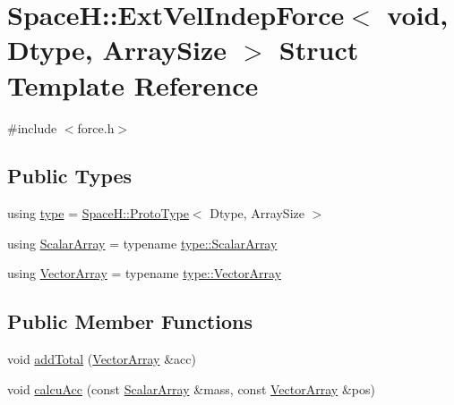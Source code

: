 \hypertarget{struct_space_h_1_1_ext_vel_indep_force_3_01void_00_01_dtype_00_01_array_size_01_4}{}\section{SpaceH\+:\+:Ext\+Vel\+Indep\+Force$<$ void, Dtype, Array\+Size $>$ Struct Template Reference}
\label{struct_space_h_1_1_ext_vel_indep_force_3_01void_00_01_dtype_00_01_array_size_01_4}


{\ttfamily \#include $<$force.\+h$>$}

\subsection*{Public Types}
\begin{DoxyCompactItemize}
\item 
using \mbox{\hyperlink{struct_space_h_1_1_ext_vel_indep_force_3_01void_00_01_dtype_00_01_array_size_01_4_a1d5ec14368fdd57d1cea251229ba72f7}{type}} = \mbox{\hyperlink{struct_space_h_1_1_proto_type}{Space\+H\+::\+Proto\+Type}}$<$ Dtype, Array\+Size $>$
\item 
using \mbox{\hyperlink{struct_space_h_1_1_ext_vel_indep_force_3_01void_00_01_dtype_00_01_array_size_01_4_ab186d960b853d69afb7cdbb19af71639}{Scalar\+Array}} = typename \mbox{\hyperlink{struct_space_h_1_1_proto_type_a09ef91dc8a37a044c403f5a833044725}{type\+::\+Scalar\+Array}}
\item 
using \mbox{\hyperlink{struct_space_h_1_1_ext_vel_indep_force_3_01void_00_01_dtype_00_01_array_size_01_4_a2f23924c3395826cf1701b5b0c74be50}{Vector\+Array}} = typename \mbox{\hyperlink{struct_space_h_1_1_proto_type_a622b8e122b33bb4966a02299fb7b82d6}{type\+::\+Vector\+Array}}
\end{DoxyCompactItemize}
\subsection*{Public Member Functions}
\begin{DoxyCompactItemize}
\item 
void \mbox{\hyperlink{struct_space_h_1_1_ext_vel_indep_force_3_01void_00_01_dtype_00_01_array_size_01_4_a358d0f758147a31d7d9e41b8e4d7fda7}{add\+Total}} (\mbox{\hyperlink{struct_space_h_1_1_ext_vel_indep_force_3_01void_00_01_dtype_00_01_array_size_01_4_a2f23924c3395826cf1701b5b0c74be50}{Vector\+Array}} \&acc)
\item 
void \mbox{\hyperlink{struct_space_h_1_1_ext_vel_indep_force_3_01void_00_01_dtype_00_01_array_size_01_4_a2eaf0655966479362ded7fddc5273008}{calcu\+Acc}} (const \mbox{\hyperlink{struct_space_h_1_1_ext_vel_indep_force_3_01void_00_01_dtype_00_01_array_size_01_4_ab186d960b853d69afb7cdbb19af71639}{Scalar\+Array}} \&mass, const \mbox{\hyperlink{struct_space_h_1_1_ext_vel_indep_force_3_01void_00_01_dtype_00_01_array_size_01_4_a2f23924c3395826cf1701b5b0c74be50}{Vector\+Array}} \&pos)
\end{DoxyCompactItemize}


